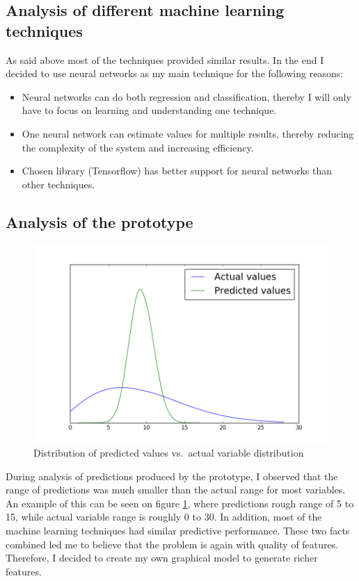\documentclass[12pt,a4paper]{book}
\begin{document}
\subsection{Analysis of different machine learning techniques}
As said above most of the techniques provided similar results.
In the end I decided to use neural networks as my main technique for the following reasons:
\begin{itemize}
\item Neural networks can do both regression and classification, thereby I will only have to focus on learning and understanding one technique.
\item One neural network can estimate values for multiple results, thereby reducing the complexity of the system and increasing efficiency.
\item Chosen library (Tensorflow) has better support for neural networks than other techniques.
\end{itemize}

\subsection{Analysis of the prototype}
\begin{figure}[ht]
\centering
\includegraphics[scale=0.5]{predicted_assists}
\caption{Distribution of predicted values vs.\ actual variable distribution}
\label{fig:variablerange}
\end{figure}
During analysis of predictions produced by the prototype, I observed that the range of predictions was much smaller than the actual range for most variables.
An example of this can be seen on figure \ref{fig:variablerange}, where predictions rough range of 5 to 15, while actual variable range is roughly 0 to 30.
In addition, most of the machine learning techniques had similar predictive performance.
These two facts combined led me to believe that the problem is again with quality of features.
Therefore, I decided to create my own graphical model to generate richer features.
\end{document}
